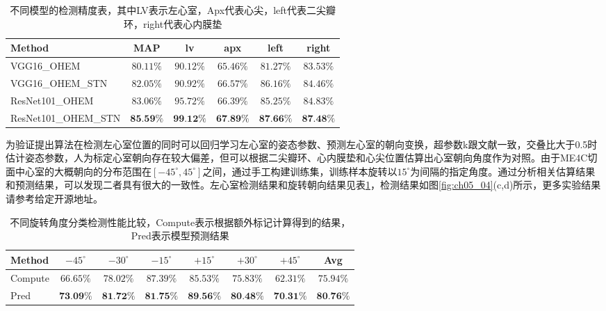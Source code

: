 \begin{table}[!htbp]
    \centering
    \footnotesize%
    \setlength{\tabcolsep}{4pt}%
    \renewcommand{\arraystretch}{1.2}%
    \begin{tabular}{lccccc}
        \cline{1-6}%
           \qquad Method  & MAP & lv &apx &left &right\\
         
        \hline
        VGG16\_OHEM & $80.11\%$ & $90.12\%$& $65.46\%$ & $81.27\%$& $83.53\%$\\        
        \hline
        VGG16\_OHEM\_STN & $82.05\%$ & $90.92\%$& $66.57\%$& $86.16\%$& $84.46\%$ \\
        \hline
        ResNet101\_OHEM & $83.06\%$ & $95.72\%$& $66.39\%$& $85.25\%$& $84.83\%$ \\
        \hline
        ResNet101\_OHEM\_STN & $\textbf{85.59\%}$ & $\textbf{99.12\%}$ & $\textbf{67.89\%}$ & $\textbf{87.66\%}$ & $\textbf{87.48\%}$\\
        \hline\hline
    \end{tabular}
    \caption[不同模型的检测精度表]{不同模型的检测精度表，其中LV表示左心室，Apx代表心尖，left代表二尖瓣环，right代表心内膜垫}
    \label{tab:ch05_03}
\end{table}


为验证提出算法在检测左心室位置的同时可以回归学习左心室的姿态参数、预测左心室的朝向变换，超参数k跟文献一致，交叠比大于0.5时估计姿态参数，人为标定心室朝向存在较大偏差，但可以根据二尖瓣环、心内膜垫和心尖位置估算出心室朝向角度作为对照。由于ME4C切面中心室的大概朝向的分布范围在$[-45^{\circ},45^{\circ}]$之间，通过手工构建训练集，训练样本旋转以$15^{\circ}$为间隔的指定角度。通过分析相关估算结果和预测结果，可以发现二者具有很大的一致性。左心室检测结果和旋转朝向结果见表\ref{tab:ch05_03}，检测结果如图\ref{fig:ch05_04}(c,d)所示，更多实验结果请参考给定开源地址。
\begin{table}[!htbp]
    \centering
    \footnotesize%
    \setlength{\tabcolsep}{4pt}%
    \renewcommand{\arraystretch}{1.2}%
    \begin{tabular}{lccccccc}
        \cline{1-8}%
            Method  & $-45^{\circ}$ & $-30^{\circ}$ & $-15^{\circ}$ & $+15^{\circ}$ & $+30^{\circ}$&$ +45^{\circ}$& Avg\\
         
        \hline
        Compute & $66.65\%$ & $78.02\%$& $87.39\%$& $85.53\%$& $75.83\%$ &$62.31\%$ &$75.94\%$  \\
        \hline
        Pred & $\textbf{73.09\%}$ & $\textbf{81.72\%}$ & $\textbf{81.75\%}$ & $\textbf{89.56\%}$ & $\textbf{80.48\%}$& $\textbf{70.31\%}$& $\textbf{80.76\%}$\\
        \hline\hline
    \end{tabular}
    \caption[不同旋转角度分类检测性能比较]{不同旋转角度分类检测性能比较，Compute表示根据额外标记计算得到的结果，Pred表示模型预测结果}
    \label{tab:ch05_04}
\end{table}

